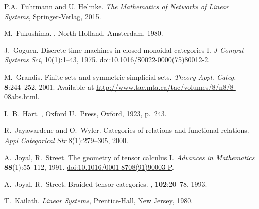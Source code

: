 \begin{thebibliography}{RSW00}
    P.A.~Fuhrmann and U. Helmke.
    \newblock \emph{The Mathematics of Networks of Linear Systems},
    Springer-Verlag, 2015. 

    M.\ Fukushima.
    ,
    North-Holland, Amsterdam, 1980.

    J.\ Goguen.
    \newblock Discrete-time machines in closed monoidal categories I.
    \newblock \emph{J Comput Systems Sci}, 10(1):1--43, 1975.
    \newblock
    \href{http://doi.org/10.1016/S0022-0000(75)80012-2}{doi:10.1016/S0022-0000(75)80012-2}.

    M.\ Grandis.
    \newblock Finite sets and symmetric simplicial sets.
    \newblock \textsl{Theory Appl. Categ.} {\bf 8}:244--252, 2001.
    \newblock Available at
    \href{http://www.tac.mta.ca/tac/volumes/8/n8/8-08abs.html}
    {http://www.tac.mta.ca/tac/volumes/8/n8/8-08abs.html}.


    I.\ B.\ Hart.
    , Oxford U.\ Press,
    Oxford, 1923, p.\ 243.


    R.\ Jayawardene and O.\ Wyler.
    \newblock Categories of relations and functional relations.
    \newblock \emph{Appl Categorical Str} 8(1):279--305, 2000.

    A.\ Joyal, R.\ Street.
    \newblock The geometry of tensor calculus I.
    \newblock \emph{Advances in Mathematics} {\bf 88}(1):55--112, 1991.
    \newblock \href{http://doi.org/10.1016/0001-8708(91)90003-P}{doi:10.1016/0001-8708(91)90003-P}.

    A.\ Joyal, R.\ Street.
    \newblock Braided tensor categories.
    , {\bf 102}:20--78, 1993.

    T.\ Kailath.
    \newblock \emph{Linear Systems}, Prentice-Hall, New Jersey, 1980.


\end{thebibliography}
